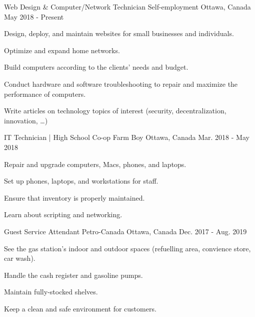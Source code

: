 \begin{cventries}
  \cventry
    {Web Design \& Computer/Network Technician} %
    {Self-employment} %
    {Ottawa, Canada} %
    {May 2018 - Present} %
    {
      \begin{cvitems} %
        \item {Design, deploy, and maintain websites for small businesses and individuals.}
        \item {Optimize and expand home networks.}
        \item {Build computers according to the clients' needs and budget.}
        \item {Conduct hardware and software troubleshooting to repair and maximize the performance of computers.}
        \item {Write articles on technology topics of interest (security, decentralization, innovation, …)}
      \end{cvitems}
    }

  \cventry
    {IT Technician | High School Co-op} %
    {Farm Boy} %
    {Ottawa, Canada} %
    {Mar. 2018 - May 2018} %
    {
      \begin{cvitems} %
        \item {Repair and upgrade computers, Macs, phones, and laptops.}
        \item {Set up phones, laptops, and workstations for staff.}
        \item {Ensure that inventory is properly maintained.}
        \item {Learn about scripting and networking.}
      \end{cvitems}
    }

\cventry
  {Guest Service Attendant} %
  {Petro-Canada} %
  {Ottawa, Canada} %
  {Dec. 2017 - Aug. 2019} %
  {
    \begin{cvitems} %
      \item {See the gas station's indoor and outdoor spaces (refuelling area, convience store, car wash).}
      \item {Handle the cash register and gasoline pumps.}
      \item {Maintain fully-stocked shelves.}
      \item {Keep a clean and safe environment for customers.}
    \end{cvitems}
  }

\end{cventries}
